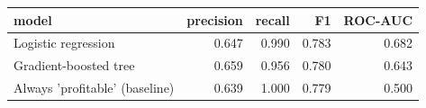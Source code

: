 \begin{tabular}{lrrrr}
\toprule
model & precision & recall & F1 & ROC-AUC \\
\midrule
Logistic regression & 0.647 & 0.990 & 0.783 & 0.682 \\
Gradient-boosted tree & 0.659 & 0.956 & 0.780 & 0.643 \\
Always 'profitable' (baseline) & 0.639 & 1.000 & 0.779 & 0.500 \\
\bottomrule
\end{tabular}
